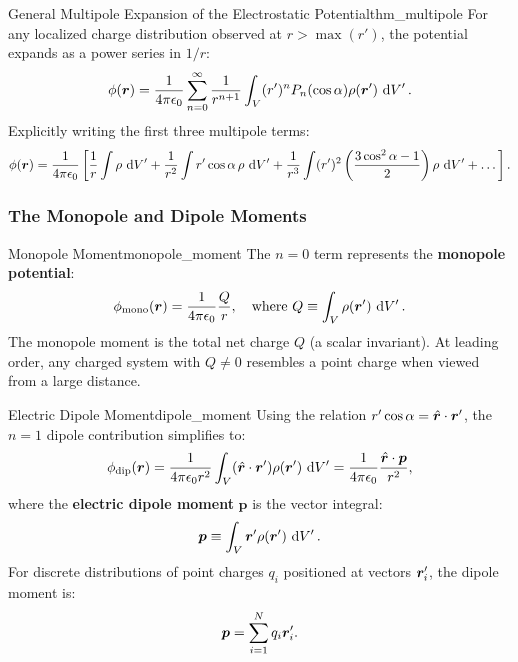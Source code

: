 \begin{theorem}{General Multipole Expansion of the Electrostatic Potential}{thm_multipole}
For any localized charge distribution observed at \(r > \max(r')\), the potential expands as a power series in \(1/r\):
\begin{equation}
    \phi(\bm{r}) = \frac{1}{4\pi\epsilon_0} \sum_{n=0}^\infty \frac{1}{r^{n+1}} \int_V (r')^n P_n(\cos\alpha)\rho(\bm{r}')\,\dd{V'}.
\end{equation}
Explicitly writing the first three multipole terms:
\begin{equation}
    \phi(\bm{r}) = \frac{1}{4\pi\epsilon_0}\left[ \frac{1}{r}\int \rho\,\dd{V'} + \frac{1}{r^2}\int r'\cos\alpha\,\rho\,\dd{V'} + \frac{1}{r^3}\int (r')^2 \left(\frac{3\cos^2\alpha - 1}{2}\right)\rho\,\dd{V'} + \dots \right].
\end{equation}
\end{theorem}

\subsubsection{The Monopole and Dipole Moments}

\begin{definition}{Monopole Moment}{monopole_moment}
The \(n = 0\) term represents the \textbf{monopole potential}:
\begin{equation}
    \phi_{\text{mono}}(\bm{r}) = \frac{1}{4\pi\epsilon_0} \frac{Q}{r}, \quad \text{where } Q \equiv \int_V \rho(\bm{r}')\,\dd{V'}.
\end{equation}
The monopole moment is the total net charge \(Q\) (a scalar invariant). At leading order, any charged system with \(Q \neq 0\) resembles a point charge when viewed from a large distance.
\end{definition}

\begin{definition}{Electric Dipole Moment}{dipole_moment}
Using the relation \(r'\cos\alpha = \hat{\bm{r}}\cdot\bm{r}'\), the \(n = 1\) dipole contribution simplifies to:
\begin{equation}
    \phi_{\text{dip}}(\bm{r}) = \frac{1}{4\pi\epsilon_0 r^2} \int_V (\hat{\bm{r}}\cdot\bm{r}')\rho(\bm{r}')\,\dd{V'} = \frac{1}{4\pi\epsilon_0}\frac{\hat{\bm{r}}\cdot\bm{p}}{r^2},
\end{equation}
where the \textbf{electric dipole moment} \(\bm{p}\) is the vector integral:
\begin{equation}
    \bm{p} \equiv \int_V \bm{r}'\rho(\bm{r}')\,\dd{V'}.
\end{equation}
For discrete distributions of point charges \(q_i\) positioned at vectors \(\bm{r}_i'\), the dipole moment is:
\begin{equation}
    \bm{p} = \sum_{i=1}^N q_i \bm{r}_i'.
\end{equation}
\end{definition}

